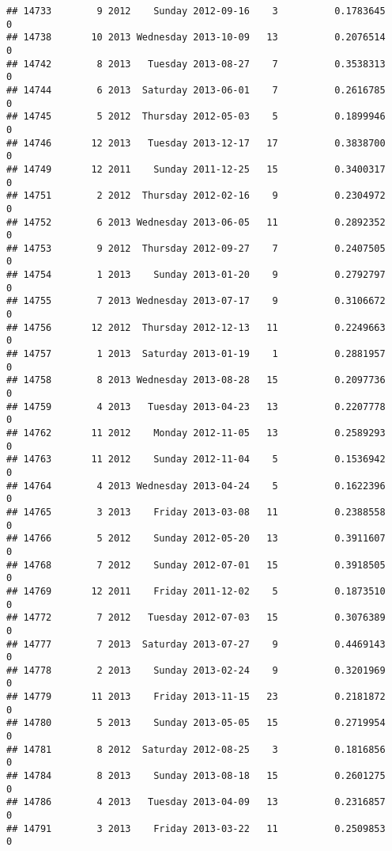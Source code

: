 \documentclass[
]{article}
\begin{document}
\begin{verbatim}
## 14733        9 2012    Sunday 2012-09-16    3          0.1783645             0
## 14738       10 2013 Wednesday 2013-10-09   13          0.2076514             0
## 14742        8 2013   Tuesday 2013-08-27    7          0.3538313             0
## 14744        6 2013  Saturday 2013-06-01    7          0.2616785             0
## 14745        5 2012  Thursday 2012-05-03    5          0.1899946             0
## 14746       12 2013   Tuesday 2013-12-17   17          0.3838700             0
## 14749       12 2011    Sunday 2011-12-25   15          0.3400317             0
## 14751        2 2012  Thursday 2012-02-16    9          0.2304972             0
## 14752        6 2013 Wednesday 2013-06-05   11          0.2892352             0
## 14753        9 2012  Thursday 2012-09-27    7          0.2407505             0
## 14754        1 2013    Sunday 2013-01-20    9          0.2792797             0
## 14755        7 2013 Wednesday 2013-07-17    9          0.3106672             0
## 14756       12 2012  Thursday 2012-12-13   11          0.2249663             0
## 14757        1 2013  Saturday 2013-01-19    1          0.2881957             0
## 14758        8 2013 Wednesday 2013-08-28   15          0.2097736             0
## 14759        4 2013   Tuesday 2013-04-23   13          0.2207778             0
## 14762       11 2012    Monday 2012-11-05   13          0.2589293             0
## 14763       11 2012    Sunday 2012-11-04    5          0.1536942             0
## 14764        4 2013 Wednesday 2013-04-24    5          0.1622396             0
## 14765        3 2013    Friday 2013-03-08   11          0.2388558             0
## 14766        5 2012    Sunday 2012-05-20   13          0.3911607             0
## 14768        7 2012    Sunday 2012-07-01   15          0.3918505             0
## 14769       12 2011    Friday 2011-12-02    5          0.1873510             0
## 14772        7 2012   Tuesday 2012-07-03   15          0.3076389             0
## 14777        7 2013  Saturday 2013-07-27    9          0.4469143             0
## 14778        2 2013    Sunday 2013-02-24    9          0.3201969             0
## 14779       11 2013    Friday 2013-11-15   23          0.2181872             0
## 14780        5 2013    Sunday 2013-05-05   15          0.2719954             0
## 14781        8 2012  Saturday 2012-08-25    3          0.1816856             0
## 14784        8 2013    Sunday 2013-08-18   15          0.2601275             0
## 14786        4 2013   Tuesday 2013-04-09   13          0.2316857             0
## 14791        3 2013    Friday 2013-03-22   11          0.2509853             0

\end{verbatim}
\end{document}
